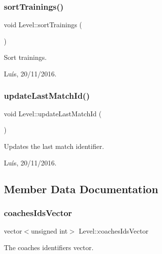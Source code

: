 \subsubsection{\texorpdfstring{sort\+Trainings()}{sortTrainings()}}
{\footnotesize\ttfamily void Level\+::sort\+Trainings (\begin{DoxyParamCaption}{ }\end{DoxyParamCaption})}



Sort trainings. 

Luís, 20/11/2016. \hypertarget{class_level_ad3f226396e776c339ae2a33e4cebd2c3}{}\label{class_level_ad3f226396e776c339ae2a33e4cebd2c3} 
\subsubsection{\texorpdfstring{update\+Last\+Match\+Id()}{updateLastMatchId()}}
{\footnotesize\ttfamily void Level\+::update\+Last\+Match\+Id (\begin{DoxyParamCaption}{ }\end{DoxyParamCaption})}



Updates the last match identifier. 

Luís, 20/11/2016. 

\subsection{Member Data Documentation}
\hypertarget{class_level_a2244ded7cbc3e261c400042dcd1f765f}{}\label{class_level_a2244ded7cbc3e261c400042dcd1f765f} 
\subsubsection{\texorpdfstring{coaches\+Ids\+Vector}{coachesIdsVector}}
{\footnotesize\ttfamily vector$<$unsigned int$>$ Level\+::coaches\+Ids\+Vector\hspace{0.3cm}{\ttfamily [private]}}



The coaches identifiers vector. 

\hypertarget{class_level_a4c6c8eb32ad6dbc8b7dae820de6db4ba}{}\label{class_level_a4c6c8eb32ad6dbc8b7dae820de6db4ba} 

